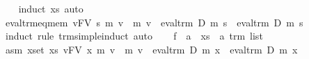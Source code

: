 \begin{isabellebody}
%
\isadelimproof
\ \ %
\endisadelimproof
%
\isatagproof
{}\isamarkupfalse%
\ {}induct\ xs{}\ auto{}%
\endisatagproof
{\isafoldproof}%
%
\isadelimproof
\isanewline
%
\endisadelimproof
\isanewline
{}\isamarkupfalse%
\ eval{}trm{}eq{}mem{}\ {}{}{}v{}FV\ s{}\ m{}\ v\ {}\ m{}\ v{}\ {}\ eval{}trm\ D\ m{}\ s\ {}\ eval{}trm\ D\ m{}\ s{}\isanewline
%
\isadelimproof
%
\endisadelimproof
%
\isatagproof
{}\isamarkupfalse%
\ {}induct\ rule{}\ trm{}simple{}induct{}\ auto{}\isanewline
\ \ \isamarkupfalse%
\ f\ {}{}\ {}{}a{}\ \ xs\ {}{}\ {}{}a\ trm\ list{}\isanewline
\ \ \isamarkupfalse%
\ asm{}{}\ {}{}x{}set\ xs{}\ {}{}v{}FV\ x{}\ m{}\ v\ {}\ m{}\ v{}\ {}\ eval{}trm\ D\ m{}\ x\ {}\ eval{}trm\ D\ m{}\ x{}\isanewline

\end{isabellebody}
